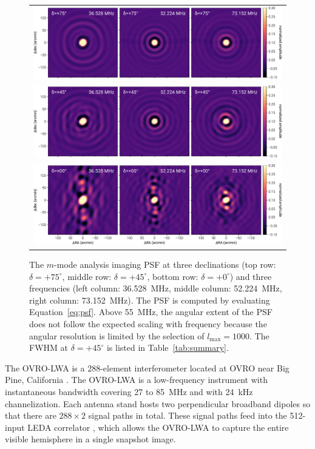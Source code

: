 \documentclass[twocolumn]{aastex61}
\begin{document}
\begin{figure}[t]
    \begin{tabular}{c}
        \includegraphics[width=\textwidth]{figures/psf/psf+75} \\
        \includegraphics[width=\textwidth]{figures/psf/psf+45} \\
        \includegraphics[width=\textwidth]{figures/psf/psf+0} \\
    \end{tabular}
    \caption{
        The $m$-mode analysis imaging PSF at three declinations (top row: $\delta=+75^\circ$, middle
        row: $\delta=+45^\circ$, bottom row: $\delta=+0^\circ$) and three frequencies (left column:
        36.528~MHz, middle column: 52.224~MHz, right column: 73.152~MHz).  The PSF is computed by
        evaluating Equation~\ref{eq:psf}. Above 55~MHz, the angular extent of the PSF does not
        follow the expected scaling with frequency because the angular resolution is limited by the
        selection of $l_\text{max}=1000$. The FWHM at $\delta=+45^\circ$ is listed in
        Table~\ref{tab:summary}.
    }
    \label{fig:psf}
\end{figure}

The OVRO-LWA is a 288-element interferometer located at OVRO near Big Pine, California
\citep{hallinan_2017}.  The OVRO-LWA is a low-frequency instrument with instantaneous bandwidth
covering 27 to 85~MHz and with 24~kHz channelization.  Each antenna stand hosts two perpendicular
broadband dipoles so that there are $288\times2$ signal paths in total. These signal paths feed into
the 512-input LEDA correlator \citep{2015JAI.....450003K}, which allows the OVRO-LWA to capture the
entire visible hemisphere in a single snapshot image.
\end{document}
